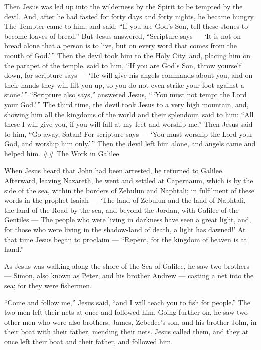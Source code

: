  Then Jesus was led up into the wilderness by the Spirit to
be tempted by the devil.  And, after he had fasted for forty
days and forty nights, he became hungry.  The Tempter came
to him, and said: ``If you are God's Son, tell these stones to become
loaves of bread.''  But Jesus answered, ``Scripture says ---
`It is not on bread alone that a person is to live, but on every word
that comes from the mouth of God.'\,''  Then the devil took
him to the Holy City, and, placing him on the parapet of the temple,
said to him,  ``If you are God's Son, throw yourself down,
for scripture says --- `He will give his angels commands about you, and
on their hands they will lift you up, so you do not even strike your
foot against a stone.'\,''  ``Scripture also says,''
answered Jesus, ``\,`You must not tempt the Lord your God.'\,''
 The third time, the devil took Jesus to a very high
mountain, and, showing him all the kingdoms of the world and their
splendour, said to him:  ``All these I will give you, if you
will fall at my feet and worship me.''  Then Jesus said to
him, ``Go away, Satan! For scripture says --- `You must worship the Lord
your God, and worship him only.'\,''  Then the devil left
him alone, and angels came and helped him. \#\# The Work in Galilee

 When Jesus heard that John had been arrested, he returned
to Galilee.  Afterward, leaving Nazareth, he went and
settled at Capernaum, which is by the side of the sea, within the
borders of Zebulun and Naphtali;  in fulfilment of these
words in the prophet Isaiah ---  `The land of Zebulun and
the land of Naphtali, the land of the Road by the sea, and beyond the
Jordan, with Galilee of the Gentiles ---  The people who
were living in darkness have seen a great light, and, for those who were
living in the shadow-land of death, a light has dawned!' 
At that time Jesus began to proclaim --- ``Repent, for the kingdom of
heaven is at hand.''

 As Jesus was walking along the shore of the Sea of
Galilee, he saw two brothers --- Simon, also known as Peter, and his
brother Andrew --- casting a net into the sea; for they were fishermen.

 ``Come and follow me,'' Jesus said, ``and I will teach you
to fish for people.''  The two men left their nets at once
and followed him.  Going further on, he saw two other men
who were also brothers, James, Zebedee's son, and his brother John, in
their boat with their father, mending their nets. Jesus called them,
 and they at once left their boat and their father, and
followed him.

